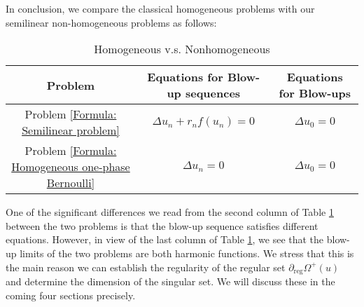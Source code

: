 \documentclass[11pt,reqno]{amsart}
\begin{document}
\begin{remark}\label{Remark: Homo v.s. Nonhomo}
	In conclusion, we compare the classical homogeneous problems with our semilinear non-homogeneous problems as follows:
	\begin{table}[H]
		\begin{center}
			\caption{Homogeneous v.s. Nonhomogeneous}
			\label{table:1}
			\begin{tabular}{|c|c|c|}
				\hline \textbf{Problem} & \textbf{Equations for Blow-up sequences} & \textbf{Equations for Blow-ups} \\
				\hline Problem \eqref{Formula: Semilinear problem} & $\Delta u_{n}+r_{n}f(u_{n})=0$ & $\Delta u_{0}=0$ \\
				\hline Problem \eqref{Formula: Homogeneous one-phase Bernoulli} & $\Delta u_{n}=0$ & $\Delta u_{0}=0$ \\
				\hline
			\end{tabular}
		\end{center}
	\end{table}
	One of the significant differences we read from the second column of Table \ref{table:1} between the two problems is that the blow-up sequence satisfies different equations. However, in view of the last column of Table \ref{table:1}, we see that the blow-up limits of the two problems are both harmonic functions. We stress that this is the main reason we can establish the regularity of the regular set $\partial_{\mathrm{reg}}\varOmega^{+}(u)$ and determine the dimension of the singular set. We will discuss these in the coming four sections precisely.
\end{remark}
\end{document}
